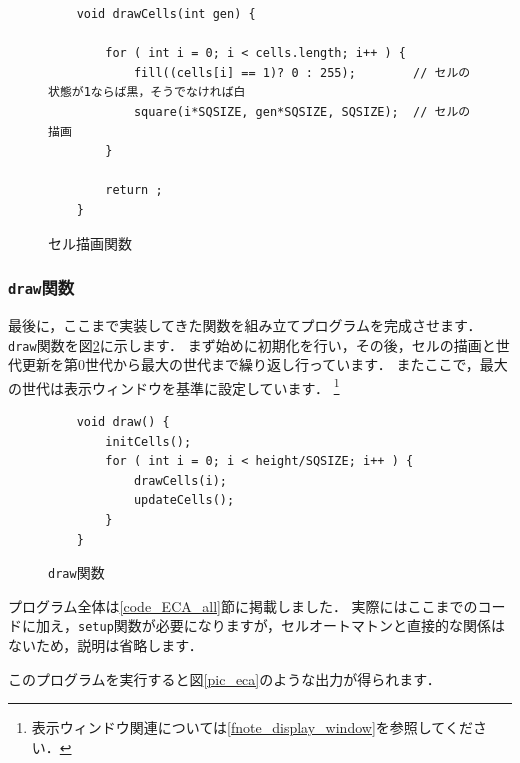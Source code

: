 \documentclass[dvipdfmx]{jsarticle}
\theoremstyle{definition}
\begin{document}
\begin{figure}[ht]
\begin{center}
\begin{oframed}
\footnotesize
\begin{verbatim}
    void drawCells(int gen) {

        for ( int i = 0; i < cells.length; i++ ) {
            fill((cells[i] == 1)? 0 : 255);        // セルの状態が1ならば黒，そうでなければ白
            square(i*SQSIZE, gen*SQSIZE, SQSIZE);  // セルの描画
        }

        return ;
    }
\end{verbatim}
\end{oframed}
\end{center}
\caption{セル描画関数}
\label{code_celldraw}
\end{figure}


\subsubsection{\texttt{draw}関数}

最後に，ここまで実装してきた関数を組み立てプログラムを完成させます．
\verb|draw|関数を図\ref{code_draw}に示します．
まず始めに初期化を行い，その後，セルの描画と世代更新を第0世代から最大の世代まで繰り返し行っています．
またここで，最大の世代は表示ウィンドウを基準に設定しています．
\footnote{
    表示ウィンドウ関連については\ref{fnote_display_window}を参照してください．
}

\begin{figure}[ht]
\begin{center}
\begin{oframed}
\footnotesize
\begin{verbatim}
    void draw() {
        initCells();
        for ( int i = 0; i < height/SQSIZE; i++ ) {
            drawCells(i);
            updateCells();
        }
    }
\end{verbatim}
\end{oframed}
\end{center}
\caption{\texttt{draw}関数}
\label{code_draw}
\end{figure}

プログラム全体は\ref{code_ECA_all}節に掲載しました．
実際にはここまでのコードに加え，\verb|setup|関数が必要になりますが，セルオートマトンと直接的な関係はないため，説明は省略します．

このプログラムを実行すると図\ref{pic_eca}のような出力が得られます．
\end{document}
